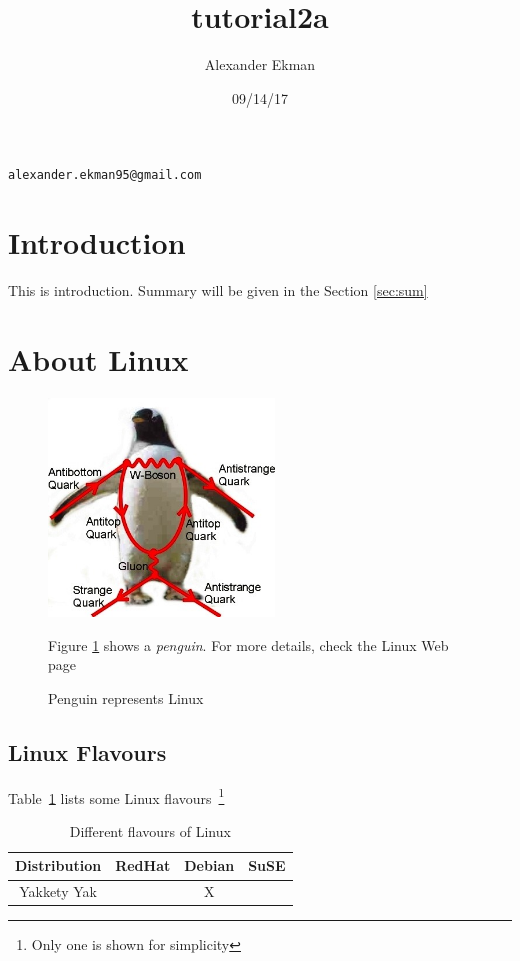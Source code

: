 \documentclass[a4paper,10pt,twoside]{article}
\author{Alexander Ekman}
\title{tutorial2a}
\date{09/14/17}
\begin{document}
\maketitle

\begin{center}
\texttt{alexander.ekman95@gmail.com}
\end{center}

\section{Introduction}
\label{sec:intro}

This is introduction. Summary will be given in the Section \ref{sec:sum}

\section{About Linux}
\label{sec:linux}

\begin{figure}[h]
  \begin{center}
 \includegraphics[width=6cm]{penguin.jpg}
 \caption{Penguin represents Linux}
 \label{fig:penguin}
  \end{center}
  
Figure \ref{fig:penguin} shows a \textit{penguin}. For more details, check the Linux Web page~\cite{linux}

\end{figure}

\subsection{Linux Flavours}
\label{sec:flavours}

Table~\ref{tab:flavours} lists some Linux flavours~\footnote{Only one is shown for simplicity}

\begin{table}
 \begin{center}
 
 \label{tab:flavours}
 
  \begin{tabular}{|c|c|c|c|}
    \hline
   \textbf{Distribution}&RedHat&Debian&SuSE\\\hline\hline
   Yakkety Yak		&	&X	&	\\
   \hline
  \end{tabular}
 \caption{Different flavours of Linux}
 \end{center}

\end{table}
\end{document}
